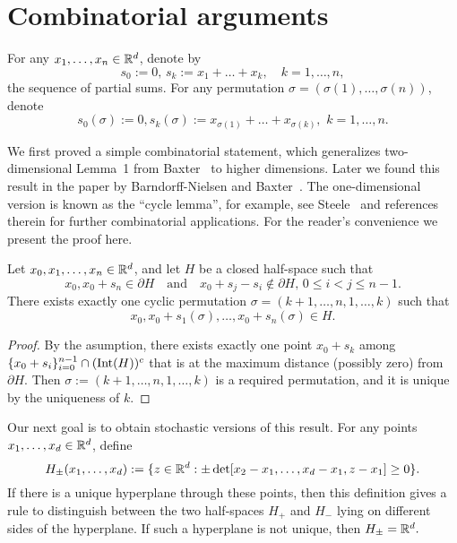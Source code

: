 \documentclass[12pt, reqno]{amsart}
\begin{document}
\section{Combinatorial arguments}\label{1333}

For any $x_1, \dots, x_n \in \mathbb{R}^d$, denote by
$$
s_0:=0, \, s_k:=x_1+\dots + x_k, \quad  k=1,\dots,n,
$$
the sequence of partial sums. For any permutation $\sigma=(\sigma(1),\dots,\sigma(n))$, denote
$$
s_0(\sigma) := 0, s_k(\sigma):=x_{\sigma(1)}+\dots+x_{\sigma(k)}, \,\, k=1,\dots, n.
$$


We first proved a simple combinatorial statement, which generalizes two-dimensional Lemma~1 from Baxter~\cite{Baxter} to higher dimensions. Later we found this result in the paper by Barndorff-Nielsen and Baxter~\cite{Nielsen}. The one-dimensional version is known as the ``cycle lemma'', for example, see Steele~\cite[Section 4]{Steele2002} and references therein for further combinatorial applications. For the reader's convenience we present the proof here.

\begin{lem}\label{Lemma comb}
Let $x_0, x_1,\dots,x_n\in \mathbb{R}^d$, and let $H$ be a closed half-space such that
$$
x_0, x_0+ s_n \in \partial H \quad \mbox{and} \quad x_0 + s_j - s_i \notin \partial H, \, 0\le i < j \le n-1.
$$
There exists exactly one cyclic permutation $\sigma=(k+1,\dots,n,1,\dots,k)$ such that
$$
x_0, x_0 + s_1(\sigma),\dots, x_0 + s_n(\sigma)\in H.
$$
\end{lem}

\begin{proof}
By the asumption, there exists exactly one point $x_0 + s_k$ among $\{ x_0 + s_i \}_{i=0}^{n-1} \cap (\mathop{\mathrm{Int}}\nolimits(H))^c$ that is
at the maximum distance (possibly zero) from $\partial H$. Then $\sigma:=(k+1,\dots,n,1,\dots,k)$ is a required permutation, and it is unique by the uniqueness of $k$.
\end{proof}

Our next goal is to obtain stochastic versions of this result. For any points $x_1,\dots, x_d \in \mathbb{R}^d$, define
$$H_\pm(x_1,\dots, x_d):=\{z \in \mathbb{R}^d: \pm \det [ x_2 - x_1, \dots,  x_d - x_1, z - x_1 ] \ge 0 \}.$$
If there is a unique hyperplane through these points, then this definition gives a rule to distinguish between the two half-spaces $H_+$ and $H_-$ lying on different sides of the hyperplane. If such a hyperplane is not unique, then $H_\pm = \mathbb{R}^d.$
\end{document}
